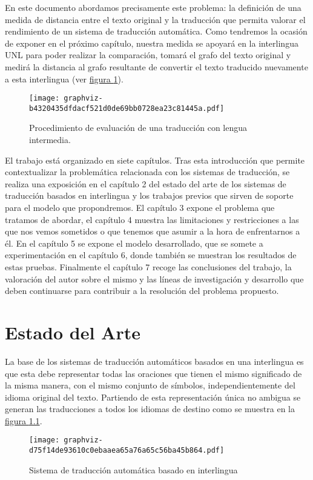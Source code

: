 \documentclass[a4paper,12pt,spanish]{book}
\begin{document}
En este documento abordamos precisamente este problema: la definición de una medida
de distancia entre el texto original y la traducción que permita valorar el
rendimiento de un sistema de traducción automática. Como tendremos la ocasión de
exponer en el próximo capítulo, nuestra medida se apoyará en la interlingua UNL para
poder realizar la comparación, tomará el grafo del texto original y medirá la
distancia al grafo resultante de convertir el texto traducido nuevamente a esta
interlingua (ver \hyperref[0.intro:fig-problema-interlingua]{figura  \ref*{0.intro:fig-problema-interlingua}}).
\begin{figure}[htbp]
\centering
\capstart

\texttt{[image: graphviz-b4320435dfdacf521d0de69bb0728ea23c81445a.pdf]}
\caption{Procedimiento de evaluación de una traducción con lengua intermedia.}\label{0.intro:fig-problema-interlingua}\end{figure}

El trabajo está organizado en siete capítulos. Tras esta introducción que permite
contextualizar la problemática relacionada con los sistemas de traducción, se realiza
una exposición en el capítulo 2 del estado del arte de los sistemas de traducción
basados en interlingua y los trabajos previos que sirven de soporte para el modelo
que propondremos. El capítulo 3 expone el problema que tratamos de abordar, el
capítulo 4 muestra las limitaciones y restricciones a las que nos vemos sometidos o
que tenemos que asumir a la hora de enfrentarnos a él. En el capítulo 5 se expone
el modelo desarrollado, que se somete a experimentación en el capítulo 6, donde también
se muestran los resultados de estas pruebas. Finalmente el capítulo 7 recoge las
conclusiones del trabajo, la valoración del autor sobre el mismo y las líneas
de investigación y desarrollo que deben continuarse para contribuir a la
resolución del problema propuesto.
\newpage

\chapter{Estado del Arte}
\label{1.state-of-the-art/index:estado-del-arte}\label{1.state-of-the-art/index::doc}
La base de los sistemas de traducción automáticos basados en una interlingua es
que esta debe representar todas las oraciones que tienen el mismo
significado de la misma manera, con el mismo conjunto de símbolos, independientemente
del idioma original del texto. Partiendo de esta representación única no ambigua
se generan las traducciones a todos los idiomas de destino como se muestra en
la \hyperref[1.state-of-the-art/index:fig-interlingua-esquema]{figura  \ref*{1.state-of-the-art/index:fig-interlingua-esquema}}.
\begin{figure}[htbp]
\centering
\capstart

\texttt{[image: graphviz-d75f14de93610c0ebaaea65a76a65c56ba45b864.pdf]}
\caption{Sistema de traducción automática basado en interlingua}\label{1.state-of-the-art/index:fig-interlingua-esquema}\end{figure}
\end{document}
